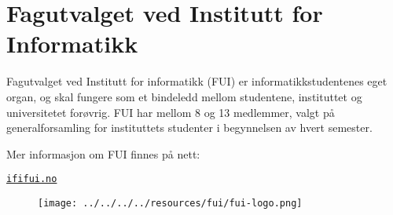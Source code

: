 \section{Fagutvalget ved Institutt for Informatikk}
Fagutvalget ved Institutt for informatikk (FUI) er informatikkstudentenes eget organ, og skal
fungere som et bindeledd mellom studentene, instituttet og universitetet forøvrig. FUI har mellom 8 og 13 medlemmer, valgt på generalforsamling for instituttets studenter i begynnelsen av hvert semester.

Mer informasjon om FUI finnes på nett:
\begin{center}
\href{http://ififui.no/}{\texttt{ififui.no}}
\end{center}

\begin{figure}[H]
\begin{center}
\texttt{[image: ../../../../resources/fui/fui-logo.png]}
\end{center}
\end{figure}


